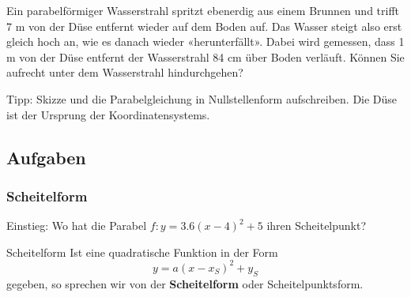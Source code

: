 Ein parabelförmiger Wasserstrahl spritzt ebenerdig aus einem Brunnen
und trifft 7 m von der Düse entfernt wieder auf dem Boden auf.
Das Wasser steigt also erst gleich hoch an, wie es danach wieder «herunterfällt».
Dabei wird gemessen, dass 1 m von der Düse entfernt der Wasserstrahl 84
cm über Boden verläuft.
Können Sie aufrecht unter dem Wasserstrahl hindurchgehen?

Tipp: Skizze und  die Parabelgleichung in Nullstellenform aufschreiben. Die Düse ist der Ursprung der Koordinatensystems.\\



\subsection*{Aufgaben}%
\newpage

\subsubsection{Scheitelform}
Einstieg: Wo hat die Parabel $f: y=3.6(x-4)^2 + 5$ ihren
Scheitelpunkt?


\begin{gesetz}{Scheitelform}{}
  Ist eine quadratische Funktion in der Form
$$y = a(x-x_S)^2 + y_S$$
gegeben, so sprechen wir von der \textbf{Scheitelform} oder Scheitelpunktsform.
\end{gesetz}

